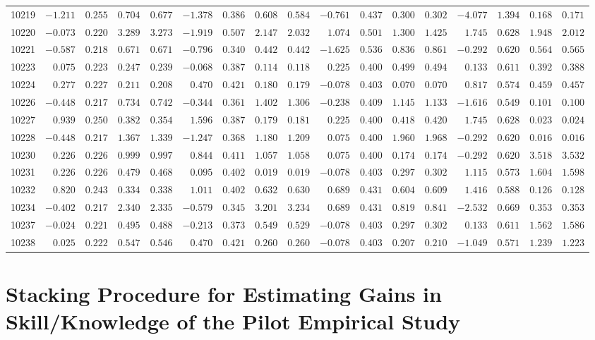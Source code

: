 \begin{landscape}
{\begin{longtable}{l|rrrr|rrrr|rrrr|rrrr}
10219&$-1.211$&$0.255$&$0.704$&$0.677$&$-1.378$&$0.386$&$0.608$&$0.584$&$-0.761$&$0.437$&$0.300$&$0.302$&$-4.077$&$1.394$&$0.168$&$0.171$\tabularnewline
10220&$-0.073$&$0.220$&$3.289$&$3.273$&$-1.919$&$0.507$&$2.147$&$2.032$&$ 1.074$&$0.501$&$1.300$&$1.425$&$ 1.745$&$0.628$&$1.948$&$2.012$\tabularnewline
10221&$-0.587$&$0.218$&$0.671$&$0.671$&$-0.796$&$0.340$&$0.442$&$0.442$&$-1.625$&$0.536$&$0.836$&$0.861$&$-0.292$&$0.620$&$0.564$&$0.565$\tabularnewline
10223&$ 0.075$&$0.223$&$0.247$&$0.239$&$-0.068$&$0.387$&$0.114$&$0.118$&$ 0.225$&$0.400$&$0.499$&$0.494$&$ 0.133$&$0.611$&$0.392$&$0.388$\tabularnewline
10224&$ 0.277$&$0.227$&$0.211$&$0.208$&$ 0.470$&$0.421$&$0.180$&$0.179$&$-0.078$&$0.403$&$0.070$&$0.070$&$ 0.817$&$0.574$&$0.459$&$0.457$\tabularnewline
10226&$-0.448$&$0.217$&$0.734$&$0.742$&$-0.344$&$0.361$&$1.402$&$1.306$&$-0.238$&$0.409$&$1.145$&$1.133$&$-1.616$&$0.549$&$0.101$&$0.100$\tabularnewline
10227&$ 0.939$&$0.250$&$0.382$&$0.354$&$ 1.596$&$0.387$&$0.179$&$0.181$&$ 0.225$&$0.400$&$0.418$&$0.420$&$ 1.745$&$0.628$&$0.023$&$0.024$\tabularnewline
10228&$-0.448$&$0.217$&$1.367$&$1.339$&$-1.247$&$0.368$&$1.180$&$1.209$&$ 0.075$&$0.400$&$1.960$&$1.968$&$-0.292$&$0.620$&$0.016$&$0.016$\tabularnewline
10230&$ 0.226$&$0.226$&$0.999$&$0.997$&$ 0.844$&$0.411$&$1.057$&$1.058$&$ 0.075$&$0.400$&$0.174$&$0.174$&$-0.292$&$0.620$&$3.518$&$3.532$\tabularnewline
10231&$ 0.226$&$0.226$&$0.479$&$0.468$&$ 0.095$&$0.402$&$0.019$&$0.019$&$-0.078$&$0.403$&$0.297$&$0.302$&$ 1.115$&$0.573$&$1.604$&$1.598$\tabularnewline
10232&$ 0.820$&$0.243$&$0.334$&$0.338$&$ 1.011$&$0.402$&$0.632$&$0.630$&$ 0.689$&$0.431$&$0.604$&$0.609$&$ 1.416$&$0.588$&$0.126$&$0.128$\tabularnewline
10234&$-0.402$&$0.217$&$2.340$&$2.335$&$-0.579$&$0.345$&$3.201$&$3.234$&$ 0.689$&$0.431$&$0.819$&$0.841$&$-2.532$&$0.669$&$0.353$&$0.353$\tabularnewline
10237&$-0.024$&$0.221$&$0.495$&$0.488$&$-0.213$&$0.373$&$0.549$&$0.529$&$-0.078$&$0.403$&$0.297$&$0.302$&$ 0.133$&$0.611$&$1.562$&$1.586$\tabularnewline
10238&$ 0.025$&$0.222$&$0.547$&$0.546$&$ 0.470$&$0.421$&$0.260$&$0.260$&$-0.078$&$0.403$&$0.207$&$0.210$&$-1.049$&$0.571$&$1.239$&$1.223$\tabularnewline
\hline
\end{longtable}}\end{landscape}

\newpage
\section{Stacking Procedure for Estimating Gains in Skill/Knowledge of the Pilot Empirical Study}
\label{sec:irt-learning-outcomes-pilot-study}



